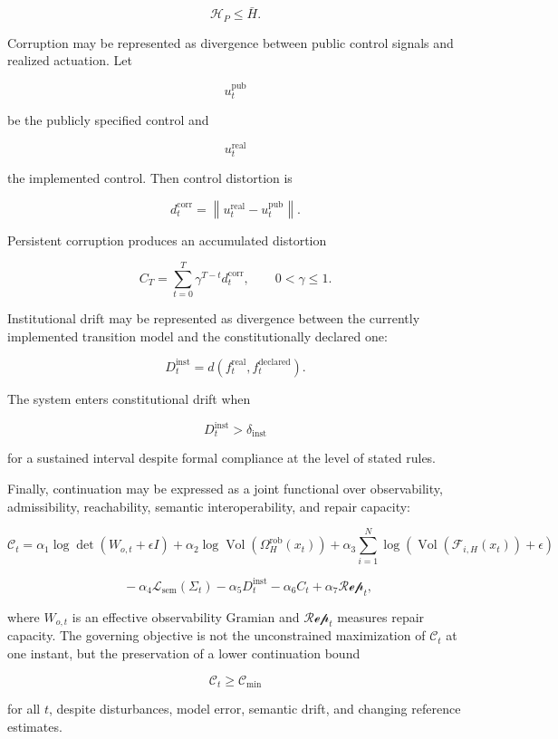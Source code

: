 \documentclass[12pt,a4paper]{article}
\DeclareMathOperator{\Vol}{Vol}
\begin{document}
\[
\mathcal{H}_{P}
\leq
\bar{H}.
\]

Corruption may be represented as divergence between public control signals and realized actuation. Let

\[
u_t^{\mathrm{pub}}
\]

be the publicly specified control and

\[
u_t^{\mathrm{real}}
\]

the implemented control. Then control distortion is

\[
d_t^{\mathrm{corr}}
=
\left\|
u_t^{\mathrm{real}}
-
u_t^{\mathrm{pub}}
\right\|.
\]

Persistent corruption produces an accumulated distortion

\[
C_T
=
\sum_{t=0}^{T}
\gamma^{T-t}
d_t^{\mathrm{corr}},
\qquad
0<\gamma\leq 1.
\]

Institutional drift may be represented as divergence between the currently implemented transition model and the constitutionally declared one:

\[
D_t^{\mathrm{inst}}
=
d
\left(
f_t^{\mathrm{real}},
f_t^{\mathrm{declared}}
\right).
\]

The system enters constitutional drift when

\[
D_t^{\mathrm{inst}}
>
\delta_{\mathrm{inst}}
\]

for a sustained interval despite formal compliance at the level of stated rules.

Finally, continuation may be expressed as a joint functional over observability, admissibility, reachability, semantic interoperability, and repair capacity:

\[
\mathcal{C}_t
=
\alpha_1
\log\det
\left(
W_{o,t}+\epsilon I
\right)
+
\alpha_2
\log
\Vol
\left(
\Omega_H^{\mathrm{rob}}(x_t)
\right)
+
\alpha_3
\sum_{i=1}^{N}
\log
\left(
\Vol
\left(
\mathcal{F}_{i,H}(x_t)
\right)
+
\epsilon
\right)
\]

\[
\qquad
-
\alpha_4
\mathcal{L}_{\mathrm{sem}}(\Sigma_t)
-
\alpha_5
D_t^{\mathrm{inst}}
-
\alpha_6
C_t
+
\alpha_7
\mathcal{R\!ep}_t,
\]

where \(W_{o,t}\) is an effective observability Gramian and \(\mathcal{R\!ep}_t\) measures repair capacity. The governing objective is not the unconstrained maximization of \(\mathcal{C}_t\) at one instant, but the preservation of a lower continuation bound

\[
\mathcal{C}_t
\geq
\mathcal{C}_{\min}
\]

for all \(t\), despite disturbances, model error, semantic drift, and changing reference estimates.
\end{document}
